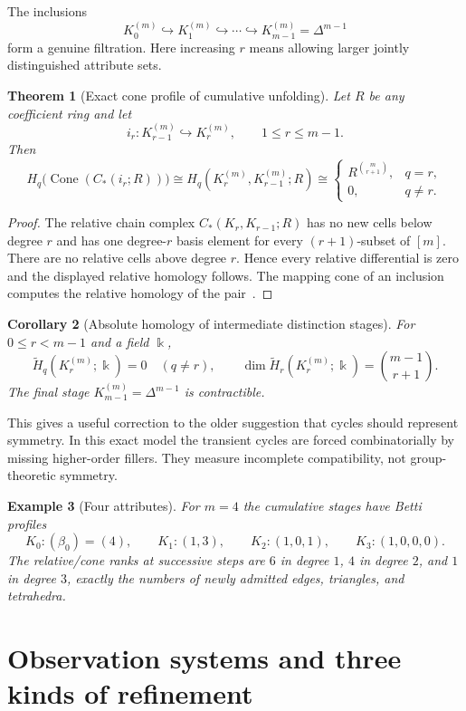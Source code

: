 \documentclass[11pt]{article}
\newtheorem{theorem}{Theorem}[section]
\newtheorem{corollary}[theorem]{Corollary}
\newtheorem{example}[theorem]{Example}
\newcommand{\Cone}{\operatorname{Cone}}
\begin{document}
The inclusions
\[
K_0^{(m)}\hookrightarrow K_1^{(m)}\hookrightarrow\cdots\hookrightarrow K_{m-1}^{(m)}=\Delta^{m-1}
\]
form a genuine filtration.  Here increasing $r$ means allowing larger jointly distinguished attribute sets.

\begin{theorem}[Exact cone profile of cumulative unfolding]\label{thm:skeletoncone}
Let $R$ be any coefficient ring and let
\[
i_r:K_{r-1}^{(m)}\hookrightarrow K_r^{(m)},\qquad 1\le r\le m-1.
\]
Then
\[
H_q\bigl(\Cone(C_*(i_r;R))\bigr)
\cong H_q(K_r^{(m)},K_{r-1}^{(m)};R)
\cong
\begin{cases}
R^{\binom{m}{r+1}},&q=r,\\
0,&q\neq r.
\end{cases}
\]
\end{theorem}
\begin{proof}
The relative chain complex $C_*(K_r,K_{r-1};R)$ has no new cells below degree $r$ and has one degree-$r$ basis element for every $(r+1)$-subset of $[m]$.  There are no relative cells above degree $r$.  Hence every relative differential is zero and the displayed relative homology follows.  The mapping cone of an inclusion computes the relative homology of the pair~\cite{Hatcher2002}.
\end{proof}

\begin{corollary}[Absolute homology of intermediate distinction stages]
For $0\le r<m-1$ and a field $\Bbbk$,
\[
\widetilde H_q(K_r^{(m)};\Bbbk)=0\quad(q\neq r),
\qquad
\dim\widetilde H_r(K_r^{(m)};\Bbbk)=\binom{m-1}{r+1}.
\]
The final stage $K_{m-1}^{(m)}=\Delta^{m-1}$ is contractible.
\end{corollary}

This gives a useful correction to the older suggestion that cycles should represent symmetry.  In this exact model the transient cycles are forced combinatorially by missing higher-order fillers.  They measure incomplete compatibility, not group-theoretic symmetry.

\begin{example}[Four attributes]
For $m=4$ the cumulative stages have Betti profiles
\[
K_0:(\beta_0)=(4),\qquad
K_1:(1,3),\qquad
K_2:(1,0,1),\qquad
K_3:(1,0,0,0).
\]
The relative/cone ranks at successive steps are $6$ in degree $1$, $4$ in degree $2$, and $1$ in degree $3$, exactly the numbers of newly admitted edges, triangles, and tetrahedra.
\end{example}

\section{Observation systems and three kinds of refinement}
\end{document}
